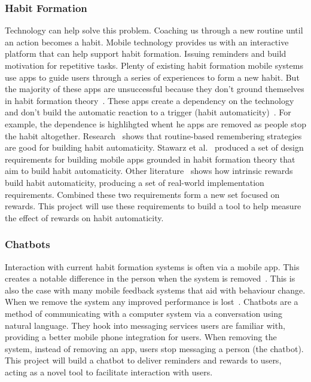 \subsubsection*{Habit Formation}
Technology can help solve this problem. Coaching us through a new routine until an action becomes a habit. Mobile technology provides us with an interactive platform that can help support habit formation. Issuing reminders and build motivation for repetitive tasks. Plenty of existing habit formation mobile systems use apps to guide users through a series of experiences to form a new habit. But the majority of these apps are unsuccessful because they don't ground themselves in habit formation theory~\cite{article_beyond_self_tracking_designing_apps, article_apps_of_steel}. These apps create a dependency on the technology and don't build the automatic reaction to a trigger (habit automaticity)~\cite{article_dont_kick_habit}. For example, the dependence is highlihgted whent he apps are removed as people stop the habit altogether.\newline
\newline
Research~\cite{article_understanding_use_contextual_cues_design_impl} shows that routine-based remembering strategies are good for building habit automaticity. Stawarz et al.~\cite{article_dont_forget_your_pill} produced a set of design requirements for building mobile apps grounded in habit formation theory that aim to build habit automaticity. Other literature~\cite{article_taxonomy_motivational_affordances_meaningful} shows how intrinsic rewards build habit automaticity, producing a set of real-world implementation requirements. Combined these two requirements form a new set focused on rewards. This project will use these requirements to build a tool to help measure the effect of rewards on habit automaticity.

\subsubsection*{Chatbots}
Interaction with current habit formation systems is often via a mobile app. This creates a notable difference in the person when the system is removed~\cite{article_my_phone_is_part_of_my_soul}. This is also the case with many mobile feedback systems that aid with behaviour change. When we remove the system any improved performance is lost~\cite{article_dont_kick_habit, article_realtime_feedback_improving_medication_taking}.\newline
\newline
Chatbots are a method of communicating with a computer system via a conversation using natural language. They hook into messaging services users are familiar with, providing a better mobile phone integration for users. When removing the system, instead of removing an app, users stop messaging a person (the chatbot). This project will build a chatbot to deliver reminders and rewards to users, acting as a novel tool to facilitate interaction with users.

